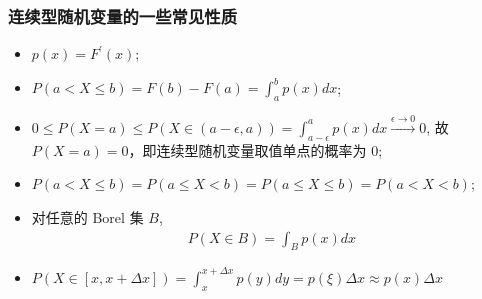 \begin{frame}
	\frametitle{连续型随机变量的一些常见性质}
	\begin{itemize}
		\item $p(x)=F^\prime (x)$;
		\item $P(a< X\le b)=F(b)-F(a)=\int_a^bp(x)dx$;
		\item $0\le P (X=a)\le P (X\in (a-\epsilon,a))=\int_{a-\epsilon}^ap (x) dx\stackrel{\epsilon\rightarrow 0}{\longrightarrow} 0$, 故 $P (X=a)=0$，即连续型随机变量取值单点的概率为 0;
		\item $P(a<X\le b)=P(a\le X<b)=P(a\le X\le b)=P(a<X<b)$;
		\item 对任意的 Borel 集 $B$,
		      \begin{eqnarray*}
			      P(X\in B)=\int_Bp(x)dx
		      \end{eqnarray*}
		\item $P(X\in[x,x+\Delta x])=\int_x^{x+\Delta x}p(y)dy=p(\xi)\Delta x\approx p(x)\Delta x$
	\end{itemize}
\end{frame}

